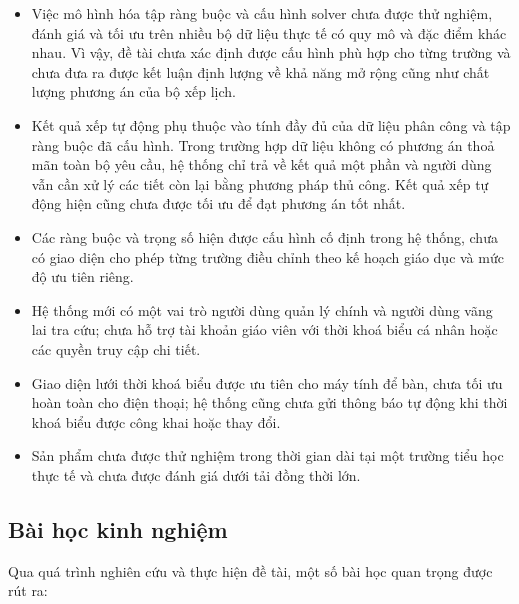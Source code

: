 \documentclass[../DoAn.tex]{subfiles}
\begin{document}
\begin{itemize}[noitemsep]
    \item Việc mô hình hóa tập ràng buộc và cấu hình solver chưa được thử
    nghiệm, đánh giá và tối ưu trên nhiều bộ dữ liệu thực tế có quy mô và đặc
    điểm khác nhau. Vì vậy, đề tài chưa xác định được cấu hình phù hợp cho từng
    trường và chưa đưa ra được kết luận định lượng về khả năng mở rộng cũng như
    chất lượng phương án của bộ xếp lịch.
    \item Kết quả xếp tự động phụ thuộc vào tính đầy đủ của dữ liệu phân công
    và tập ràng buộc đã cấu hình. Trong trường hợp dữ liệu không có phương án
    thoả mãn toàn bộ yêu cầu, hệ thống chỉ trả về kết quả một phần và người dùng
    vẫn cần xử lý các tiết còn lại bằng phương pháp thủ công. Kết quả xếp tự
    động hiện cũng chưa được tối ưu để đạt phương án tốt nhất.
    \item Các ràng buộc và trọng số hiện được cấu hình cố định trong hệ thống,
    chưa có giao diện cho phép từng trường điều chỉnh theo kế hoạch giáo dục và
    mức độ ưu tiên riêng.
    \item Hệ thống mới có một vai trò người dùng quản lý chính và người dùng
    vãng lai tra cứu; chưa hỗ trợ tài khoản giáo viên với thời khoá biểu cá nhân
    hoặc các quyền truy cập chi tiết.
    \item Giao diện lưới thời khoá biểu được ưu tiên cho máy tính để bàn, chưa
    tối ưu hoàn toàn cho điện thoại; hệ thống cũng chưa gửi thông báo tự động khi
    thời khoá biểu được công khai hoặc thay đổi.
    \item Sản phẩm chưa được thử nghiệm trong thời gian dài tại một trường tiểu
    học thực tế và chưa được đánh giá dưới tải đồng thời lớn.
\end{itemize}

\subsection{Bài học kinh nghiệm}

Qua quá trình nghiên cứu và thực hiện đề tài, một số bài học quan trọng được rút ra:
\end{document}
